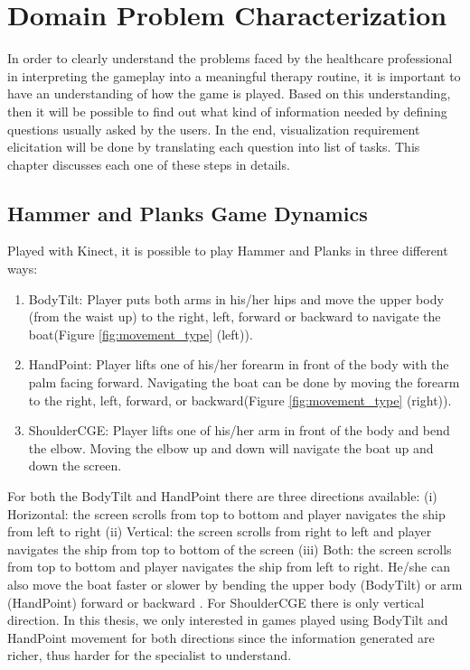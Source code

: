 \chapter{Domain Problem Characterization}
\label{chap:problem}

In order to clearly understand the problems faced by the healthcare professional in interpreting the gameplay into a meaningful therapy routine, it is important to have an understanding of how the game is played. Based on this understanding, then it will be possible to find out what kind of information needed by defining questions usually asked by the users. In the end, visualization requirement elicitation will be done by translating each question into list of tasks. This chapter discusses each one of these steps in details.

\section{Hammer and Planks Game Dynamics}

Played with Kinect, it is possible to play Hammer and Planks in three different ways:
\begin{enumerate}
  \item BodyTilt:
  Player puts both arms in his/her hips and move the upper body (from the waist up) to the right, left, forward or backward to navigate the boat(Figure \ref{fig:movement_type} (left)). 
  \item HandPoint:
  Player lifts one of his/her forearm in front of the body with the palm facing forward. Navigating the boat can be done by moving the forearm to the right, left, forward, or backward(Figure \ref{fig:movement_type} (right)).
  \item ShoulderCGE:
  Player lifts one of his/her arm in front of the body and bend the elbow. Moving the elbow up and down will navigate the boat up and down the screen.
\end{enumerate}

For both the BodyTilt and HandPoint there are three directions available: (i) Horizontal: the screen scrolls from top to bottom and player navigates the ship from left to right (ii) Vertical: the screen scrolls from right to left and player navigates the ship from top to bottom of the screen (iii) Both: the screen scrolls from top to bottom and player navigates the ship from left to right. He/she can also move the boat faster or slower by bending the upper body (BodyTilt) or arm (HandPoint) forward or backward . For ShoulderCGE there is only vertical direction. In this thesis, we only interested in games played using BodyTilt and HandPoint movement for both directions since the information generated are richer, thus harder for the specialist to understand.

